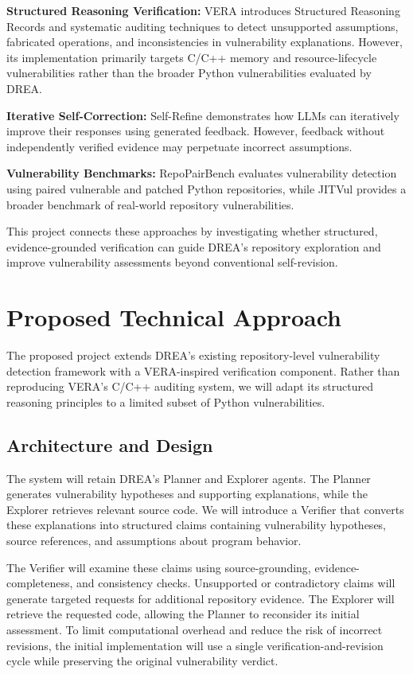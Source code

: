\documentclass[sigconf,nonacm]{acmart}
\begin{document}
\textbf{Structured Reasoning Verification:} VERA \cite{vera} introduces Structured Reasoning Records and systematic auditing techniques to detect unsupported assumptions, fabricated operations, and inconsistencies in vulnerability explanations. However, its implementation primarily targets C/C++ memory and resource-lifecycle vulnerabilities rather than the broader Python vulnerabilities evaluated by DREA.

\textbf{Iterative Self-Correction:} Self-Refine \cite{selfrefine} demonstrates how LLMs can iteratively improve their responses using generated feedback. However, feedback without independently verified evidence may perpetuate incorrect assumptions.

\textbf{Vulnerability Benchmarks:} RepoPairBench \cite{drea} evaluates vulnerability detection using paired vulnerable and patched Python repositories, while JITVul \cite{jitvul} provides a broader benchmark of real-world repository vulnerabilities.

This project connects these approaches by investigating whether structured, evidence-grounded verification can guide DREA's repository exploration and improve vulnerability assessments beyond conventional self-revision.

\section{Proposed Technical Approach}

The proposed project extends DREA's existing repository-level vulnerability detection framework with a VERA-inspired verification component. Rather than reproducing VERA's C/C++ auditing system, we will adapt its structured reasoning principles to a limited subset of Python vulnerabilities.

\subsection{Architecture and Design}

The system will retain DREA's Planner and Explorer agents. The Planner generates vulnerability hypotheses and supporting explanations, while the Explorer retrieves relevant source code. We will introduce a Verifier that converts these explanations into structured claims containing vulnerability hypotheses, source references, and assumptions about program behavior.

The Verifier will examine these claims using source-grounding, evidence-completeness, and consistency checks. Unsupported or contradictory claims will generate targeted requests for additional repository evidence. The Explorer will retrieve the requested code, allowing the Planner to reconsider its initial assessment. To limit computational overhead and reduce the risk of incorrect revisions, the initial implementation will use a single verification-and-revision cycle while preserving the original vulnerability verdict.
\end{document}
